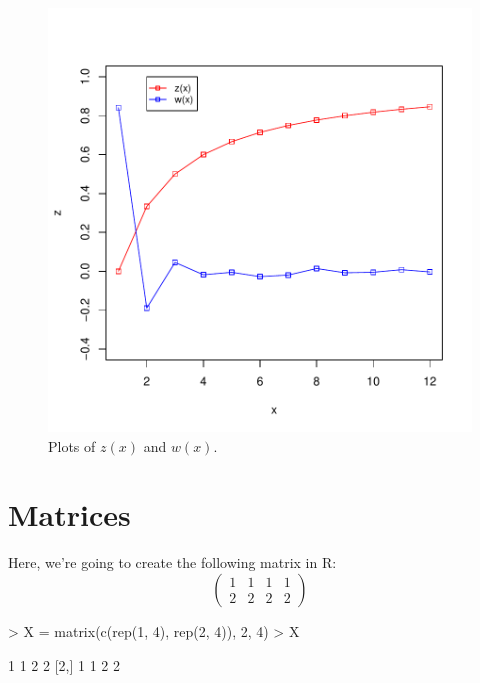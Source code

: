 \documentclass[11pt, oneside, reqno]{article}
\begin{document}
\begin{figure}
\begin{center}
\includegraphics{exercises-twoplots}
\end{center}
\caption{Plots of $z(x)$ and $w(x)$.}
\label{fig:twoplots}
\end{figure}

\eans

\section{Matrices}

Here, we're going to create the following matrix in R:
\[
\begin{pmatrix}
1&1&1&1\\
2&2&2&2
\end{pmatrix}
\]

\begin{Schunk}
\begin{Sinput}
> X = matrix(c(rep(1, 4), rep(2, 4)), 2, 4)
> X
\end{Sinput}
\begin{Soutput}
     [,1] [,2] [,3] [,4]
[1,]    1    1    2    2
[2,]    1    1    2    2
\end{Soutput}
\end{Schunk}
\end{document}

